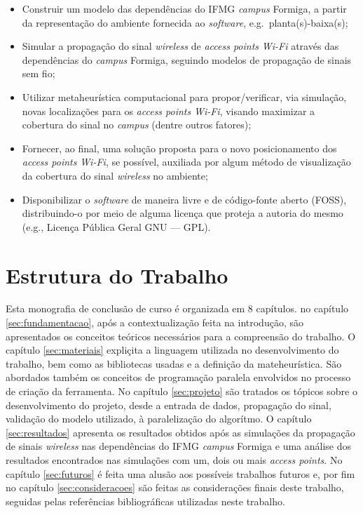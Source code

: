 \documentclass[
	12pt,				%
	twoside,			%
	a4paper,			%
	english,			%
	french,				%
	spanish,			%
	brazil				%
	]{abntex2}
\begin{document}
\begin{itemize}
\item
  Construir um modelo das dependências do IFMG \emph{campus} Formiga, a
  partir da representação do ambiente fornecida ao \emph{software},
  e.g.~planta(s)-baixa(s);
\item
  Simular a propagação do sinal \emph{wireless} de \emph{access points}
  \emph{Wi-Fi} através das dependências do \emph{campus} Formiga,
  seguindo modelos de propagação de sinais sem fio;
\item
  Utilizar metaheurística computacional para propor/verificar, via
  simulação, novas localizações para os \emph{access points}
  \emph{Wi-Fi}, visando maximizar a cobertura do sinal no \emph{campus}
  (dentre outros fatores);
\item
  Fornecer, ao final, uma solução proposta para o novo posicionamento
  dos \emph{access points} \emph{Wi-Fi}, se possível, auxiliada por
  algum método de visualização da cobertura do sinal \emph{wireless} no
  ambiente;
\item
  Disponibilizar o \emph{software} de maneira livre e de código-fonte
  aberto (FOSS), distribuindo-o por meio de alguma licença que proteja a
  autoria do mesmo (e.g., Licença Pública Geral GNU --- GPL).
\end{itemize}

\section{Estrutura do Trabalho}\label{estrutura-do-trabalho}

Esta monografia de conclusão de curso é organizada em 8 capítulos. no
capítulo \ref{sec:fundamentacao}, após a contextualização feita na
introdução, são apresentados os conceitos teóricos necessários para a
compreensão do trabalho. O capítulo \ref{sec:materiais} expliçita a
linguagem utilizada no desenvolvimento do trabalho, bem como as
bibliotecas usadas e a definição da mateheurística. São abordados também
os conceitos de programação paralela envolvidos no processo de criação
da ferramenta. No capítulo \ref{sec:projeto} são tratados os tópicos
sobre o desenvolvimento do projeto, desde a entrada de dados, propagação
do sinal, validação do modelo utilizado, à paralelização do algorítmo. O
capítulo \ref{sec:resultados} apresenta os resultados obtidos após as
simulações da propagação de sinais \emph{wireless} nas dependências do
IFMG \emph{campus} Formiga e uma análise dos resultados encontrados nas
simulações com um, dois ou mais \emph{access points}. No capítulo
\ref{sec:futuros} é feita uma alusão aos possíveis trabalhos futuros e,
por fim no capítulo \ref{sec:consideracoes} são feitas as considerações
finais deste trabalho, seguidas pelas referências bibliográficas
utilizadas neste trabalho.
\end{document}
